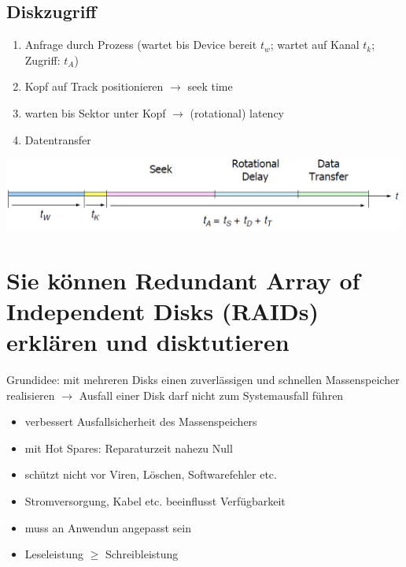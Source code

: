 \documentclass{report}
\newenvironment{Figure}
	{\par\medskip\noindent\minipage{\linewidth}}
	{\endminipage\par\medskip}
\theoremstyle{definition}
\theoremstyle{example}
\begin{document}
	\subsection{Diskzugriff}
\begin{enumerate}
	\item Anfrage durch Prozess (wartet bis Device bereit $t_w$; wartet auf Kanal $t_k$; Zugriff: $t_A$)
	\item Kopf auf Track positionieren $\rightarrow$ seek time
	\item warten bis Sektor unter Kopf $\rightarrow$ (rotational) latency
	\item Datentransfer
\end{enumerate}

\begin{Figure}
\centering
\includegraphics[width=500px]{img/Diskzugriff.png}
	\label{fig:Abbildung des Diskzugriffs}
\end{Figure}



\section{Sie können Redundant Array of Independent Disks (RAIDs) erklären und disktutieren}
Grundidee: mit mehreren Disks einen zuverlässigen und schnellen Massenspeicher realisieren $\rightarrow$ Ausfall einer Disk darf nicht zum Systemausfall führen

\begin{itemize}
	\item verbessert Ausfallsicherheit des Massenspeichers
	\item mit Hot Spares: Reparaturzeit nahezu Null
	\item schützt nicht vor Viren, Löschen, Softwarefehler etc.
	\item Stromversorgung, Kabel etc. beeinflusst Verfügbarkeit
	\item muss an Anwendun angepasst sein
	\item Leseleistung $\geq$ Schreibleistung
\end{itemize}
\end{document}
